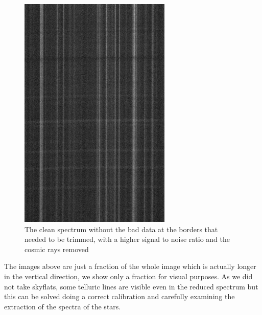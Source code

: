 \begin{figure}[H]
\begin{minipage}[b]{0.49\textwidth}
    \includegraphics[width=\textwidth]{images/cluster_clean.png}
    \caption[Clean spectrum of NGC5139]{The clean spectrum without the bad data at the borders that needed to be trimmed, with a higher signal to noise ratio and the cosmic rays removed}
  \end{minipage}
\end{figure}

The images above are just a fraction of the whole image which is actually longer in the vertical direction, we show only a fraction for visual purposes. As we did not take skyflats, some telluric lines are visible even in the reduced spectrum but this can be solved doing a correct calibration and carefully examining the extraction of the spectra of the stars.


